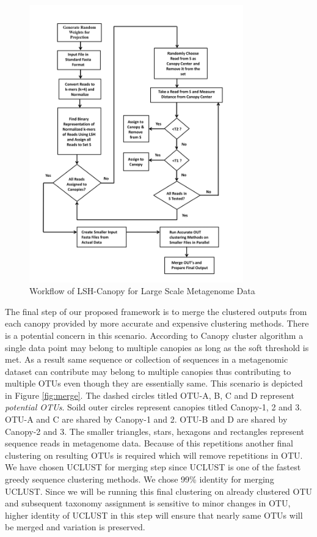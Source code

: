 \documentclass[10pt, conference, compsocconf]{IEEEtran}
\begin{document}
\begin{figure}
	\centering
	\includegraphics[width=\linewidth,height=12cm]{flowchart.png}	
	\caption{Workflow of LSH-Canopy for Large Scale Metagenome Data}
	\label{fig:flowchart}
\end{figure}

The final step of our proposed framework is to merge the clustered outputs from each canopy provided by more accurate and expensive clustering methods. There is a potential concern in this scenario. According to Canopy cluster algorithm a single data point may belong to multiple canopies as long as the soft threshold is met. As a result same sequence or collection of sequences in a metagenomic dataset can contribute may belong to multiple canopies thus contributing to multiple OTUs even though they are essentially same. This scenario is depicted in Figure \ref{fig:merge}. The dashed circles titled OTU-A, B, C and D represent \textit{potential OTUs}. Soild outer circles represent canopies titled Canopy-1, 2 and 3. OTU-A and C are shared by Canopy-1 and 2. OTU-B and D are shared by Canopy-2 and 3. The smaller triangles, stars, hexagons and rectangles represent sequence reads in metagenome data. Because of this repetitions another final clustering on resulting OTUs is required which will remove repetitions in OTU. We have chosen UCLUST for merging step since UCLUST is one of the fastest greedy sequence clustering methods. We chose 99\% identity for merging UCLUST. Since we will be running this final clustering on already clustered OTU and subsequent taxonomy assignment is sensitive to minor changes in OTU, higher identity of UCLUST in this step will ensure that nearly same OTUs will be merged and variation is preserved.
\end{document}

